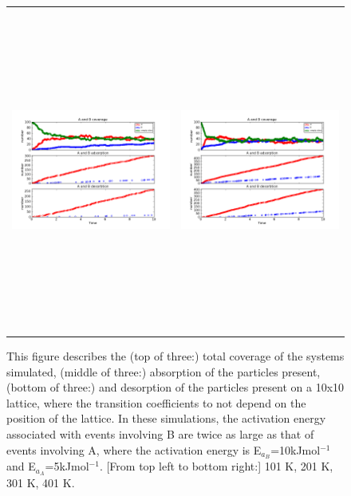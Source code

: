 \documentclass[11pt]{article}
\begin{document}
\begin{figure}[h!]
\begin{tabular}{cc}
\includegraphics[width=3.5in, height=4.2in]{./coadsorb/AtoBcoadsorb10x10_301_B2x__EA5E3_EB10E3_1.png} &
\includegraphics[width=3.5in, height=4.2in]{./coadsorb/AtoBcoadsorb10x10_401_B2x__EA5E3_EB10E3_1.png} 
\end{tabular}
\caption{This figure describes the (top of three:) total coverage of the systems simulated, (middle of three:) absorption of the particles present, (bottom of three:) and desorption of the particles present on a 10x10 lattice, where the transition coefficients to not depend on the position of the lattice. In these simulations, the activation energy associated with events involving B are twice as large as that of events involving A, where the activation energy is E$_{a_{B}}$=10kJmol$^{-1}$ and E$_{a_{A}}$=5kJmol$^{-1}$. [From top left to bottom right:] 101 K, 201 K, 301 K, 401 K.}
\end{figure}
\end{document}
